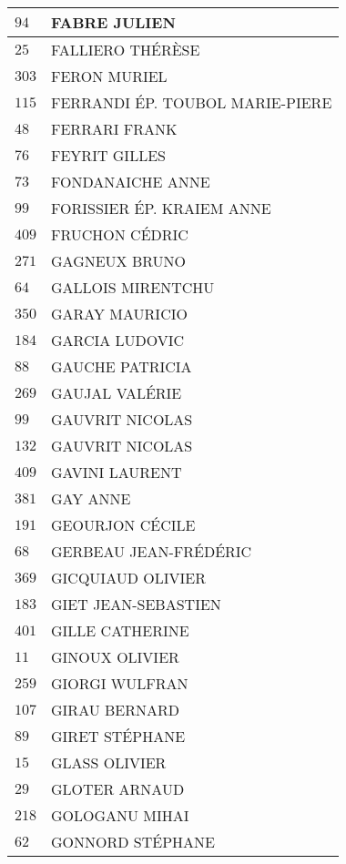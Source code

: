 \begin{xltabular}{\linewidth}{|l|X|}
    \hline
    $94$ & FABRE JULIEN \\
    \hline
    $25$ & FALLIERO THÉRÈSE \\
    \hline
    $303$ & FERON MURIEL \\
    \hline
    $115$ & FERRANDI ÉP. TOUBOL MARIE-PIERE \\
    \hline
    $48$ & FERRARI FRANK \\
    \hline
    $76$ & FEYRIT GILLES \\
    \hline
    $73$ & FONDANAICHE ANNE \\
    \hline
    $99$ & FORISSIER ÉP. KRAIEM ANNE \\
    \hline
    $409$ & FRUCHON CÉDRIC \\
    \hline
    $271$ & GAGNEUX BRUNO \\
    \hline
    $64$ & GALLOIS MIRENTCHU \\
    \hline
    $350$ & GARAY MAURICIO \\
    \hline
    $184$ & GARCIA LUDOVIC \\
    \hline
    $88$ & GAUCHE PATRICIA \\
    \hline
    $269$ & GAUJAL VALÉRIE \\
    \hline
    $99$ & GAUVRIT NICOLAS \\
    \hline
    $132$ & GAUVRIT NICOLAS \\
    \hline
    $409$ & GAVINI LAURENT \\
    \hline
    $381$ & GAY ANNE \\
    \hline
    $191$ & GEOURJON CÉCILE \\
    \hline
    $68$ & GERBEAU JEAN-FRÉDÉRIC \\
    \hline
    $369$ & GICQUIAUD OLIVIER \\
    \hline
    $183$ & GIET JEAN-SEBASTIEN \\
    \hline
    $401$ & GILLE CATHERINE \\
    \hline
    $11$ & GINOUX OLIVIER \\
    \hline
    $259$ & GIORGI WULFRAN \\
    \hline
    $107$ & GIRAU BERNARD \\
    \hline
    $89$ & GIRET STÉPHANE \\
    \hline
    $15$ & GLASS OLIVIER \\
    \hline
    $29$ & GLOTER ARNAUD \\
    \hline
    $218$ & GOLOGANU MIHAI \\
    \hline
    $62$ & GONNORD STÉPHANE \\

\end{xltabular}
